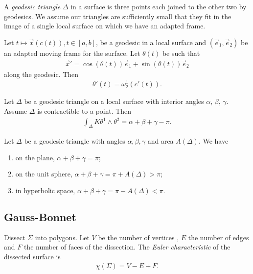 \documentclass{article}
\begin{document}
\begin{definition}
	A \emph{geodesic triangle} $\Delta$ in a surface is three points each joined to the other
	two by geodesics. We assume our triangles are sufficiently small that they fit in the image
	of a single local surface on which we have an adapted frame.
\end{definition}

\begin{proposition}[Notes 15.2]
	Let $t\mapsto \vec x(c(t)), t\in[a,b]$, be a geodesic in a local surface and $(\vec e_1, \vec e_2)$
	be an adapted moving frame for the surface. Let $\theta(t)$ be such that
	\begin{align*}
		\vec x' = \cos(\theta(t)) \vec e_1 + \sin(\theta(t)) \vec e_2
	\end{align*}
	along the geodesic. Then
	\begin{align*}
		\theta'(t) = \omega_2^1 (c'(t)).
	\end{align*}
\end{proposition}

\begin{theorem}[Notes 15.3]
	Let $\Delta$ be a geodesic triangle on a local surface with interior angles $\alpha$, $\beta$,
	$\gamma$. Assume $\Delta$ is contractible to a point. Then
	\begin{align*}
		\int_\Delta K\theta^1\wedge\theta^2 = \alpha + \beta + \gamma - \pi.
	\end{align*}
\end{theorem}

\begin{corollary}[Notes 15.4]
	Let $\Delta$ be a geodesic triangle with angles $\alpha,\beta,\gamma$ and area $A(\Delta)$.
	We have
	\begin{enumerate}
		\item on the plane, $\alpha+\beta+\gamma = \pi$;
		\item on the unit sphere, $\alpha + \beta + \gamma = \pi + A(\Delta) > \pi$;
		\item in hyperbolic space, $\alpha + \beta + \gamma = \pi - A(\Delta) < \pi$.
	\end{enumerate}
\end{corollary}

\subsection{Gauss-Bonnet}

\begin{definition}
	Dissect $\Sigma$ into polygons. Let $V$ be the number of vertices , $E$ the number of edges
	and $F$ the number of faces of the dissection. The \emph{Euler characteristic} of the
	dissected surface is
	\begin{align*}
		\chi(\Sigma) = V - E + F.
	\end{align*}
\end{definition}
\end{document}

